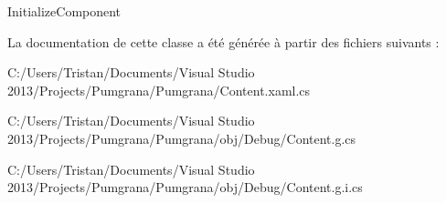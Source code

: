 Initialize\+Component 



La documentation de cette classe a été générée à partir des fichiers suivants \+:\begin{DoxyCompactItemize}
\item 
C\+:/\+Users/\+Tristan/\+Documents/\+Visual Studio 2013/\+Projects/\+Pumgrana/\+Pumgrana/Content.\+xaml.\+cs\item 
C\+:/\+Users/\+Tristan/\+Documents/\+Visual Studio 2013/\+Projects/\+Pumgrana/\+Pumgrana/obj/\+Debug/Content.\+g.\+cs\item 
C\+:/\+Users/\+Tristan/\+Documents/\+Visual Studio 2013/\+Projects/\+Pumgrana/\+Pumgrana/obj/\+Debug/Content.\+g.\+i.\+cs\end{DoxyCompactItemize}

